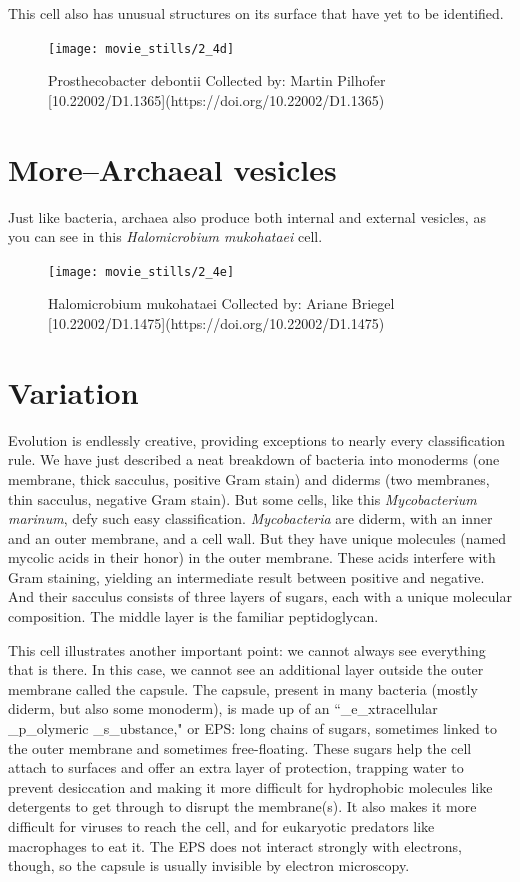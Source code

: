 \documentclass[]{tufte-book}
\begin{document}
This cell also has unusual structures on its surface that have yet to be
identified.

\begin{figure}
\texttt{[image: movie\_stills/2\_4d]} \caption[Prosthecobacter debontii Collected by]{Prosthecobacter debontii Collected by: Martin Pilhofer [10.22002/D1.1365](https://doi.org/10.22002/D1.1365)}\label{fig:unnamed-chunk-31}
\end{figure}

\hypertarget{morearchaeal-vesicles}{\section{More--Archaeal
vesicles}\label{morearchaeal-vesicles}}

Just like bacteria, archaea also produce both internal and external
vesicles, as you can see in this \emph{Halomicrobium mukohataei} cell.

\begin{figure}
\texttt{[image: movie\_stills/2\_4e]} \caption[Halomicrobium mukohataei Collected by]{Halomicrobium mukohataei Collected by: Ariane Briegel [10.22002/D1.1475](https://doi.org/10.22002/D1.1475)}\label{fig:unnamed-chunk-32}
\end{figure}

\section{Variation}\label{variation}

Evolution is endlessly creative, providing exceptions to nearly every
classification rule. We have just described a neat breakdown of bacteria
into monoderms (one membrane, thick sacculus, positive Gram stain) and
diderms (two membranes, thin sacculus, negative Gram stain). But some
cells, like this \emph{Mycobacterium marinum}, defy such easy
classification. \emph{Mycobacteria} are diderm, with an inner and an
outer membrane, and a cell wall. But they have unique molecules (named
mycolic acids in their honor) in the outer membrane. These acids
interfere with Gram staining, yielding an intermediate result between
positive and negative. And their sacculus consists of three layers of
sugars, each with a unique molecular composition. The middle layer is
the familiar peptidoglycan.

This cell illustrates another important point: we cannot always see
everything that is there. In this case, we cannot see an additional
layer outside the outer membrane called the capsule. The capsule,
present in many bacteria (mostly diderm, but also some monoderm), is
made up of an ``\_e\_xtracellular \_p\_olymeric \_s\_ubstance," or EPS:
long chains of sugars, sometimes linked to the outer membrane and
sometimes free-floating. These sugars help the cell attach to surfaces
and offer an extra layer of protection, trapping water to prevent
desiccation and making it more difficult for hydrophobic molecules like
detergents to get through to disrupt the membrane(s). It also makes it
more difficult for viruses to reach the cell, and for eukaryotic
predators like macrophages to eat it. The EPS does not interact strongly
with electrons, though, so the capsule is usually invisible by electron
microscopy.
\end{document}
